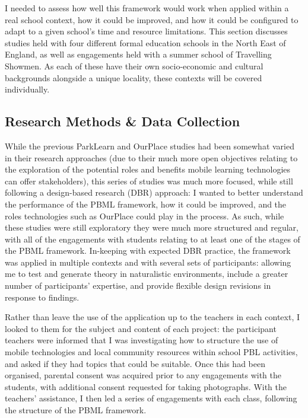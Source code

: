 I needed to assess how well this framework would work when applied within a real school context, how it could be improved, and how it could be configured to adapt to a given school's time and resource limitations. This section discusses studies held with four different formal education schools in the North East of England, as well as engagements held with a summer school of Travelling Showmen. As each of these have their own socio-economic and cultural backgrounds alongside a unique locality, these contexts will be covered individually.

\subsection{Research Methods \& Data Collection}

While the previous ParkLearn and OurPlace studies had been somewhat varied in their research approaches (due to their much more open objectives relating to the exploration of the potential roles and benefits mobile learning technologies can offer stakeholders), this series of studies was much more focused, while still following a design-based research (DBR) approach: I wanted to better understand the performance of the PBML framework, how it could be improved, and the roles technologies such as OurPlace could play in the process. As such, while these studies were still exploratory they were much more structured and regular, with all of the engagements with students relating to at least one of the stages of the PBML framework. In-keeping with expected DBR practice, the framework was applied in multiple contexts and with several sets of participants: allowing me to test and generate theory in naturalistic environments, include a greater number of participants' expertise, and provide flexible design revisions in response to findings. 

Rather than leave the use of the application up to the teachers in each context, I looked to them for the subject and content of each project: the participant teachers were informed that I was investigating how to structure the use of mobile technologies and local community resources within school PBL activities, and asked if they had topics that could be suitable. Once this had been organised, parental consent was acquired prior to any engagements with the students, with additional consent requested for taking photographs. With the teachers' assistance, I then led a series of engagements with each class, following the structure of the PBML framework. 

